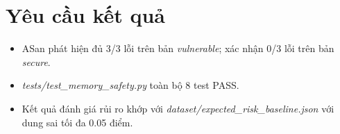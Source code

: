 \section*{Yêu cầu kết quả}

\begin{itemize}
    \item ASan phát hiện đủ 3/3 lỗi trên bản \textit{vulnerable}; xác nhận 0/3
          lỗi trên bản \textit{secure}.
    \item \textit{tests/test\_memory\_safety.py} toàn bộ 8 test PASS.
    \item Kết quả đánh giá rủi ro khớp với
          \textit{dataset/expected\_risk\_baseline.json} với dung sai tối đa
          0.05 điểm.
\end{itemize}
